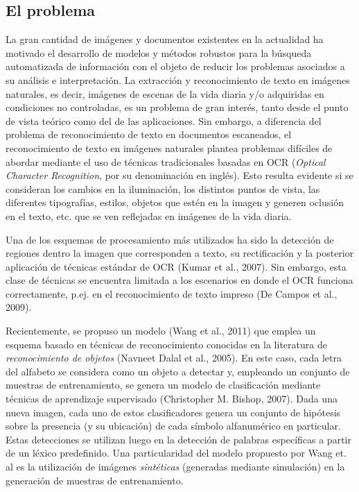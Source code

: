 \subsection{El problema}

	La gran cantidad de imágenes y documentos existentes en la actualidad ha motivado el desarrollo de modelos y métodos robustos para la búsqueda automatizada de información con el objeto de reducir los problemas asociados a su análisis e interpretación. La extracción y reconocimiento de texto en imágenes naturales, es decir, imágenes de escenas de la vida diaria y/o adquiridas en condiciones no controladas, es un problema de gran interés, tanto desde el punto de vista teórico como del de las aplicaciones.  Sin embargo, a diferencia del problema de reconocimiento de texto en documentos escaneados, el reconocimiento de texto en imágenes naturales plantea problemas difíciles de abordar mediante el uso de técnicas tradicionales basadas en OCR (\textit{Optical Character Recognition}, por su denominación en inglés). Esto resulta evidente si se consideran los cambios en la iluminación, los distintos puntos de vista, las diferentes tipografías, estilos, objetos que estén en la imagen y generen oclusión en el texto, etc. que se ven reflejadas en imágenes de la vida diaria.

	Una de los esquemas de procesamiento más utilizados ha sido la detección de regiones dentro la imagen que corresponden a texto, su rectificación y la posterior aplicación de técnicas estándar de OCR (Kumar et al., 2007). Sin embargo, esta clase de técnicas se encuentra limitada a los escenarios en donde el OCR funciona correctamente, p.ej. en el reconocimiento de texto impreso (De Campos et al., 2009).

	Recientemente, se propuso un modelo (Wang et al., 2011) que emplea un esquema basado en técnicas de reconocimiento conocidas en la literatura de \textit{reconocimiento de objetos} (Navneet Dalal et al., 2005). En este caso, cada letra del alfabeto se considera como un objeto a detectar y, empleando un conjunto de muestras de entrenamiento, se genera un modelo de clasificación mediante técnicas de aprendizaje supervisado (Christopher M. Bishop, 2007). Dada una nueva imagen, cada uno de estos clasificadores genera un conjunto de hipótesis sobre la presencia (y su ubicación) de cada símbolo alfanumérico en particular. Estas detecciones se utilizan luego en la detección de palabras específicas a partir de un léxico predefinido. Una particularidad del modelo propuesto por Wang et. al es la utilización de imágenes \textit{sintéticas} (generadas mediante simulación) en la generación de muestras de entrenamiento.
	